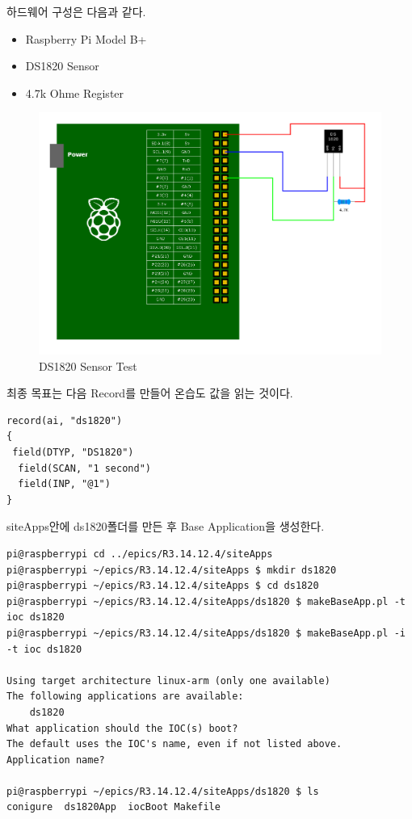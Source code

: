 \documentclass[11pt
  , a4paper
  , article
  , oneside
]{memoir}
\begin{document}
하드웨어 구성은 다음과 같다.
\begin{itemize}
\item Raspberry Pi Model B+
\item DS1820 Sensor
\item 4.7k Ohme Register
\end{itemize}
\begin{figure}[!htb]
\centering
\includegraphics[width=1\textwidth]{./images/raspberry/ds1820_test.png}
\caption{DS1820 Sensor Test}
\label{fig:ds1820_epics_test}
\end{figure}
최종 목표는 다음 Record를 만들어 온습도 값을 읽는 것이다.
\begin{lstlisting}[style=termstyle]
record(ai, "ds1820")       
{
 field(DTYP, "DS1820")
  field(SCAN, "1 second")
  field(INP, "@1")
}
\end{lstlisting}
siteApps안에 ds1820폴더를 만든 후 Base Application을 생성한다.
\begin{lstlisting}[style=termstyle]
pi@raspberrypi cd ../epics/R3.14.12.4/siteApps
pi@raspberrypi ~/epics/R3.14.12.4/siteApps $ mkdir ds1820
pi@raspberrypi ~/epics/R3.14.12.4/siteApps $ cd ds1820
pi@raspberrypi ~/epics/R3.14.12.4/siteApps/ds1820 $ makeBaseApp.pl -t ioc ds1820
pi@raspberrypi ~/epics/R3.14.12.4/siteApps/ds1820 $ makeBaseApp.pl -i -t ioc ds1820

Using target architecture linux-arm (only one available)
The following applications are available:
    ds1820
What application should the IOC(s) boot?
The default uses the IOC's name, even if not listed above.
Application name?

pi@raspberrypi ~/epics/R3.14.12.4/siteApps/ds1820 $ ls
conigure  ds1820App  iocBoot Makefile
\end{lstlisting}
\end{document}

